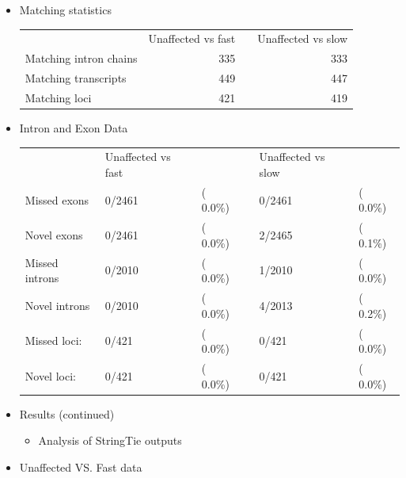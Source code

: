 \documentclass[11pt]{article}
\begin{document}
\begin{itemize}
\item Matching statistics

\begin{center}
\begin{tabular}{lrlr}
                         &  Unaffected vs fast  &     &  Unaffected vs slow  \\
 Matching intron chains  &                 335  &     &                 333  \\
 Matching transcripts    &                 449  &     &                 447  \\
 Matching loci           &                 421  &     &                 419  \\
\end{tabular}
\end{center}


\item Intron and Exon Data

\begin{center}
\begin{tabular}{llllll}
                 &  Unaffected vs fast  &             &     &  Unaffected vs slow  &            \\
 Missed exons    &  0/2461              &  (  0.0\%)  &     &  0/2461              &  ( 0.0\%)  \\
 Novel exons     &  0/2461              &  (  0.0\%)  &     &  2/2465              &  ( 0.1\%)  \\
 Missed introns  &  0/2010              &  (  0.0\%)  &     &  1/2010              &  ( 0.0\%)  \\
 Novel introns   &  0/2010              &  (  0.0\%)  &     &  4/2013              &  ( 0.2\%)  \\
 Missed loci:    &  0/421               &  (  0.0\%)  &     &  0/421               &  ( 0.0\%)  \\
 Novel loci:     &  0/421               &  (  0.0\%)  &     &  0/421               &  ( 0.0\%)  \\
\end{tabular}
\end{center}


\item Results (continued)

\begin{itemize}
\item Analysis of StringTie outputs
\end{itemize}

\item Unaffected VS. Fast data


\end{itemize}
\end{document}
